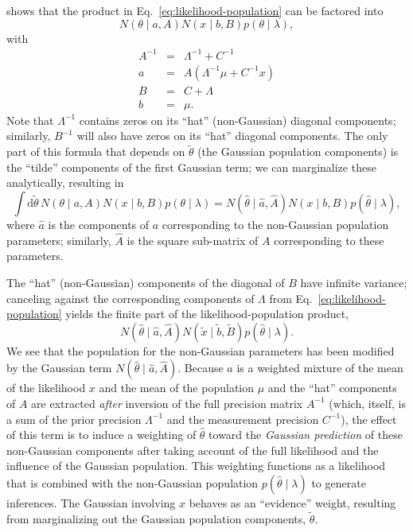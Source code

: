\documentclass[modern]{aastex631}
\newcommand{\dd}{\mathrm{d}}
\begin{document}
\citet{Hogg2020} shows that the product in Eq.\ \eqref{eq:likelihood-population}
can be factored into 
\begin{equation}
    N\left( \theta \mid a, A \right) N\left( x \mid b, B \right) p\left( \theta \mid \lambda \right),
\end{equation}
with 
\begin{eqnarray}
    A^{-1} & = & \Lambda^{-1} + C^{-1} \\
    a & = & A \left( \Lambda^{-1} \mu + C^{-1} x \right) \\ 
    B & = & C + \Lambda \\
    b & = & \mu.
\end{eqnarray}
Note that $\Lambda^{-1}$ contains zeros on its ``hat'' (non-Gaussian) diagonal
components; similarly, $B^{-1}$ will also have zeros on its ``hat'' diagonal
components. The only part of this formula that depends on $\tilde{\theta}$ (the
Gaussian population components) is the ``tilde'' components of the first
Gaussian term; we can marginalize these analytically, resulting in 
\begin{equation}
    \int \dd \tilde{\theta} \, N\left( \theta \mid a, A \right) N\left( x \mid b, B \right) p\left( \theta \mid \lambda \right) = N\left( \hat{\theta} \mid \hat{a}, \hat{A} \right) N\left( x \mid b, B \right) p\left( \hat{\theta} \mid \lambda \right),
\end{equation}
where $\hat{a}$ is the components of $a$ corresponding to the non-Gaussian
population parameters; similarly, $\hat{A}$ is the square sub-matrix of $A$
corresponding to these parameters.

The ``hat'' (non-Gaussian) components of the diagonal of $B$ have infinite
variance; canceling against the corresponding components of $\Lambda$ from Eq.\
\eqref{eq:likelihood-population} yields the finite part of the
likelihood-population product, 
\begin{equation}
    \label{eq:marginalized-likelihood}
    N\left( \hat{\theta} \mid \hat{a}, \hat{A} \right) N\left( \tilde{x} \mid \tilde{b}, \tilde{B} \right) p\left( \hat{\theta} \mid \lambda \right).
\end{equation}
We see that the population for the non-Gaussian parameters has been modified by
the Gaussian term $N\left( \hat{\theta} \mid \hat{a}, \hat{A} \right)$.  Because
$a$ is a weighted mixture of the mean of the likelihood $x$ and the mean of the
population $\mu$ and the ``hat'' components of $A$ are extracted \emph{after}
inversion of the full precision matrix $A^{-1}$ (which, itself, is a sum of the
prior precision $\Lambda^{-1}$ and the measurement precision $C^{-1}$), the
effect of this term is to induce a weighting of $\hat{\theta}$ toward the
\emph{Gaussian prediction} of these non-Gaussian components after taking account
of the full likelihood and the influence of the Gaussian population.  This
weighting functions as a likelihood that is combined with the non-Gaussian
population $p\left( \hat{\theta} \mid \lambda \right)$ to generate inferences.
The Gaussian involving $x$ behaves as an ``evidence'' weight, resulting from
marginalizing out the Gaussian population components, $\tilde{\theta}$.  
\end{document}
